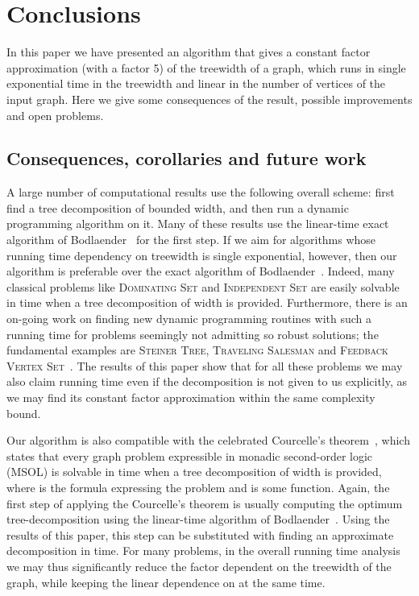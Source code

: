 \documentclass[a4paper,11pt]{article}
\theoremstyle{definition}
\theoremstyle{remark}
\begin{document}
\section{Conclusions}
\label{section:conclusions}
In this paper we have presented an algorithm that gives a constant
factor approximation (with a factor 5) of the treewidth of a graph,
which runs in single exponential time in the treewidth and linear in
the number of vertices of the input graph.  Here we give some
consequences of the result, possible improvements and open problems.

\subsection{Consequences, corollaries and future work}
A large number of computational results use the following overall
scheme: first find a tree decomposition of bounded width, and then run
a dynamic programming algorithm on it.  Many of these results use the
linear-time exact algorithm of Bodlaender~\cite{Bodlaender96} for the
first step.
If we aim for algorithms whose running time dependency on treewidth is
single exponential, however, then our algorithm is preferable over the
exact algorithm of Bodlaender~\cite{Bodlaender96}.  Indeed, many
classical problems like \textsc{Dominating Set} and
\textsc{Independent Set} are easily solvable in time 
when a tree decomposition of width  is provided.  Furthermore,
there is an on-going work on finding new dynamic programming routines
with such a running time for problems seemingly not admitting so
robust solutions; the fundamental examples are \textsc{Steiner Tree},
\textsc{Traveling Salesman} and \textsc{Feedback Vertex
  Set}~\cite{BodlaenderCKN12}.  The results of this paper show that
for all these problems we may also claim  running time
even if the decomposition is not given to us explicitly, as we may
find its constant factor approximation within the same complexity
bound.

Our algorithm is also compatible with the celebrated Courcelle's
theorem~\cite{Courcelle90}, which states that every graph problem
expressible in monadic second-order logic (MSOL) is solvable in time
 when a tree decomposition of width  is
provided, where  is the formula expressing the problem and
 is some function.  Again, the first step of applying the
Courcelle's theorem is usually computing the optimum
tree-decomposition using the linear-time algorithm of
Bodlaender~\cite{Bodlaender96}.  Using the results of this paper, this
step can be substituted with finding an approximate decomposition in
 time.  For many problems, in the overall running time
analysis we may thus significantly reduce the factor dependent on the
treewidth of the graph, while keeping the linear dependence on  at
the same time.
\end{document}
